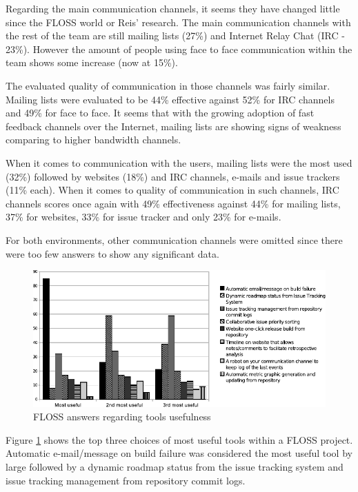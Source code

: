 \documentclass[lnbip]{svmultln}
\begin{document}
Regarding the main communication channels, it seems they have changed
little since the FLOSS world or Reis' research. The main communication
channels with the rest of the team are still mailing lists (27\%) and
Internet Relay Chat (IRC - 23\%). However the amount of people using
face to face communication within the team shows some increase (now at
15\%).

The evaluated quality of communication in those channels was fairly
similar. Mailing lists were evaluated to be 44\% effective against
52\% for IRC channels and 49\% for face to face. It seems that with
the growing adoption of fast feedback channels over the Internet,
mailing lists are showing signs of weakness comparing to higher
bandwidth channels.

When it comes to communication with the users, mailing lists were the
most used (32\%) followed by websites (18\%) and IRC channels, e-mails
and issue trackers (11\% each). When it comes to quality of
communication in such channels, IRC channels scores once again with
49\% effectiveness against 44\% for mailing lists, 37\% for websites,
33\% for issue tracker and only 23\% for e-mails.

For both environments, other communication channels were omitted since
there were too few answers to show any significant data.

\begin{figure}[htb]
  \centering
  \includegraphics{floss-tools.pdf}
  \caption{FLOSS answers regarding tools usefulness}
  \label{fig:floss-tools}
\end{figure}

Figure \ref{fig:floss-tools} shows the top three choices of most
useful tools within a FLOSS project. Automatic e-mail/message on build
failure was considered the most useful tool by large followed by a
dynamic roadmap status from the issue tracking system and issue
tracking management from repository commit logs.
\end{document}

